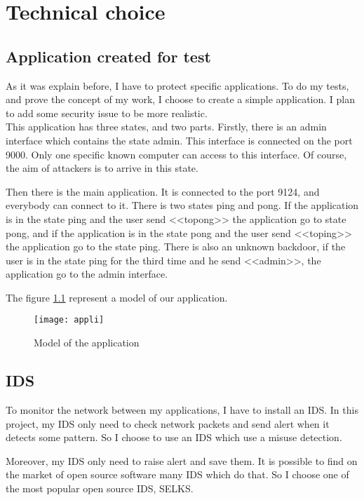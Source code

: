 
\chapter{Technical choice}
\label{chap:choice}

\section{Application created for test}

As it was explain before, I have to protect specific applications. To do my tests, and prove the concept of my
work, I choose to create a simple application. I plan to add some security issue to be more realistic.~\\


This application has three states, and two parts. Firstly, there is an admin interface which contains the state
admin. This interface is connected on the port 9000. Only one specific known computer can access to this interface.
Of course, the aim of attackers is to arrive in this state.

Then there is the main application. It is connected to the port 9124, and everybody can connect to it. There is two
states ping and pong. If the application is in the state ping and the user send <<topong>> the application go to
state pong, and if the application is in the state pong and the user send <<toping>> the application go to the
state ping. There is also an unknown backdoor, if the user is in the state ping for the third time and he send
<<admin>>, the application go to the admin interface.

The figure \ref{fig:appli} represent a model of our application.


\begin{figure}[!h]
  \centering
  \texttt{[image: appli]}
  \caption{Model of the application}
  \label{fig:appli}
\end{figure}

\section{IDS}

To monitor the network between my applications, I have to install an IDS. In this project, my IDS only need to check
network packets and send alert when it detects some pattern. So I choose to use an IDS which use a misuse detection.

Moreover, my IDS only need to raise alert and save them. It is possible to find on the market of open source
software many IDS which do that. So I choose one of the most popular open source IDS, SELKS.

